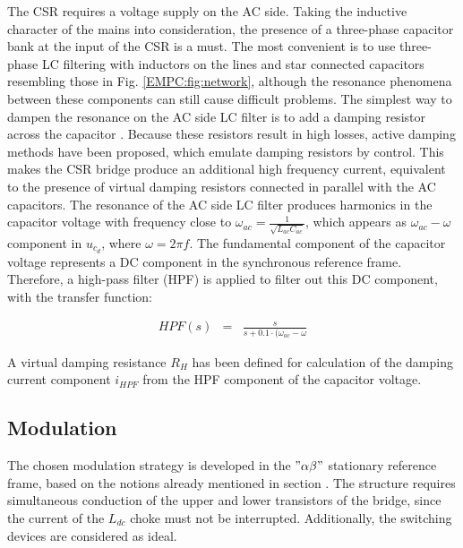     The CSR requires a voltage supply on the AC side. Taking the inductive character of the mains into consideration, the presence of a three-phase capacitor bank at the input of the CSR is a must. The most convenient is to use three-phase LC filtering with inductors on the lines and star connected capacitors resembling those in Fig. \ref{EMPC:fig:network}, although the resonance phenomena between these components can still cause difficult problems. The simplest way to dampen the resonance on the AC side LC filter is to add a damping resistor across the capacitor \cite{regaya2014new}. Because these resistors result in high losses, active damping methods have been proposed, which emulate damping resistors by control. This makes the CSR bridge produce an additional high frequency current, equivalent to the presence of virtual damping resistors connected in parallel with the AC capacitors. The resonance of the AC side LC filter produces harmonics in the capacitor voltage with frequency close to $\omega_{ac}=\frac{1}{\sqrt{L_{ac}C_{ac}}}$, which appears as $\omega_{ac}-\omega$ component in $u_{c_d}$, where $\omega=2\pi f$. The fundamental component of the capacitor voltage represents a DC component in the synchronous reference frame. Therefore, a high-pass filter (HPF) is applied to filter out this DC component, with the transfer function:

    \begin{equation}
        \begin{array}{rcl}
            HPF(s)&=&\frac{s}{s+0.1\cdot(\omega_{ac}-\omega}
        \end{array}
        \label{EMPC:equ:AC_HPF}
    \end{equation}

    A virtual damping resistance $R_H$ has been defined for calculation of the damping current component $i_{HPF}$ from the HPF component of the capacitor voltage.

\subsection{Modulation}\label{EMPC:sec:Modulation}

    The chosen modulation strategy is developed in the $"\alpha\beta"$ stationary reference frame, based on the notions already mentioned in section . The structure requires simultaneous conduction of the upper and lower transistors of the bridge, since the current of the $L_{dc}$  choke must not be interrupted. Additionally, the switching devices are considered as ideal.

